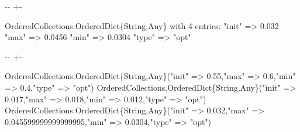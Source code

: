 \documentclass[a4paper,10pt,english]{sphinxmanual}
\newlength\nbsphinxcodecellspacing
\begin{document}
{

\kern-\sphinxverbatimsmallskipamount\kern-\baselineskip
\kern+\FrameHeightAdjust\kern-\fboxrule
\vspace{\nbsphinxcodecellspacing}

\begin{sphinxVerbatim}[commandchars=\\\{\}]
\llap{\color{nbsphinxout}[20]:\,\hspace{\fboxrule}\hspace{\fboxsep}}OrderedCollections.OrderedDict\{String,Any\} with 4 entries:
  "init" => 0.032
  "max"  => 0.0456
  "min"  => 0.0304
  "type" => "opt"
\end{sphinxVerbatim}
}

{
\begin{sphinxVerbatim}[commandchars=\\\{\}]
\llap{\color{nbsphinxin}[21]:\,\hspace{\fboxrule}\hspace{\fboxsep}}\PYG{p}{[}\PYG{p}{]}\PYG{p}{[}\PYG{p}{]}
\PYG{p}{[}\PYG{p}{]}\PYG{p}{[}\PYG{p}{]}
\PYG{p}{[}\PYG{p}{]}\PYG{p}{[}\PYG{p}{]}
\end{sphinxVerbatim}
}

{

\kern-\sphinxverbatimsmallskipamount\kern-\baselineskip
\kern+\FrameHeightAdjust\kern-\fboxrule
\vspace{\nbsphinxcodecellspacing}

\begin{sphinxVerbatim}[commandchars=\\\{\}]
OrderedCollections.OrderedDict\{String,Any\}("init" => 0.55,"max" => 0.6,"min" => 0.4,"type" => "opt")
OrderedCollections.OrderedDict\{String,Any\}("init" => 0.017,"max" => 0.018,"min" => 0.012,"type" => "opt")
OrderedCollections.OrderedDict\{String,Any\}("init" => 0.032,"max" => 0.045599999999999995,"min" => 0.0304,"type" => "opt")
\end{sphinxVerbatim}
}
\end{document}
